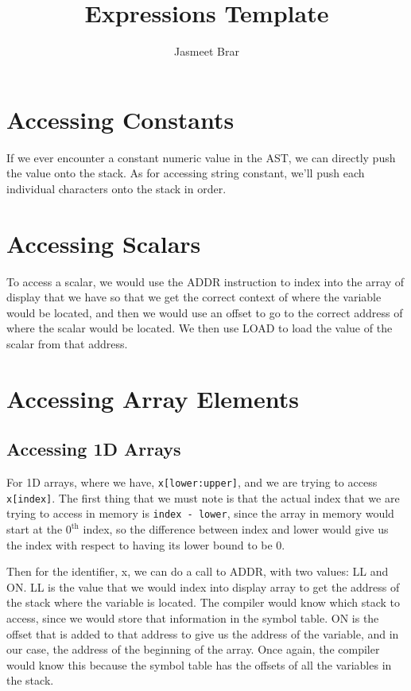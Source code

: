 \documentclass{article}
\begin{document}
	\title{Expressions Template}
	\author{Jasmeet Brar}
    \maketitle


\section{Accessing Constants}

If we ever encounter a constant numeric value in the AST, we can directly push the value onto the stack. As for accessing string constant, we'll push each individual characters onto the stack in order.

\section{Accessing Scalars}

To access a scalar, we would use the ADDR instruction to index into the array of display that we have so that we get the correct context of where the variable would be located, and then we would use an offset to go to the correct address of where the scalar would be located. We then use LOAD to load the value of the scalar from that address.

\section{Accessing Array Elements}

\subsection{Accessing 1D Arrays}

For 1D arrays, where we have, \texttt{x[lower:upper]}, and we are trying to access \texttt{x[index]}. The first thing that we must note is that the actual index that we are trying to access in memory is \texttt{index - lower}, since the array in memory would start at the $0^\text{th}$ index, so the difference between index and lower would give us the index with respect to having its lower bound to be 0.

Then for the identifier, x, we can do a call to ADDR, with two values: LL and ON. LL is the value that we would index into display array to get the address of the stack where the variable is located. The compiler would know which stack to access, since we would store that information in the symbol table. ON is the offset that is added to that address to give us the address of the variable, and in our case, the address of the beginning of the array. Once again, the compiler would know this because the symbol table has the offsets of all the variables in the stack.
\end{document}
